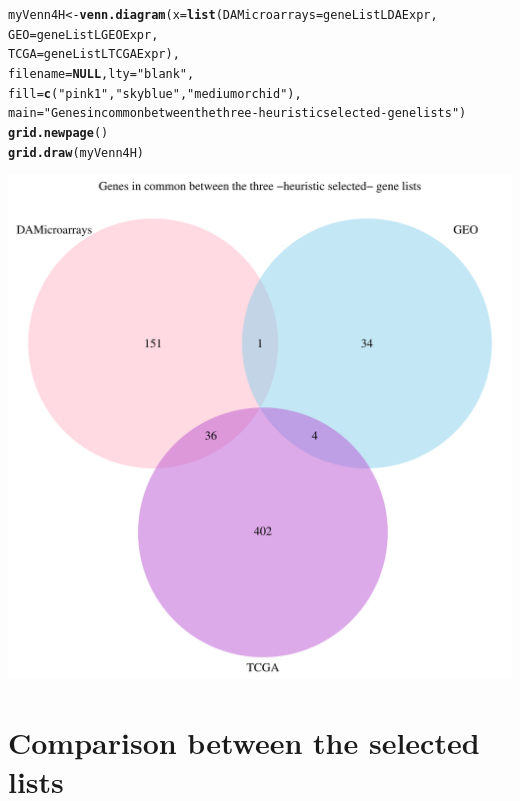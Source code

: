 \documentclass[a4paper,10pt]{article}\usepackage[]{graphicx}\usepackage[]{color}
\makeatletter
\def\maxwidth{ %
  \ifdim\Gin@nat@width>\linewidth
    \linewidth
  \else
    \Gin@nat@width
  \fi
}
\newcommand{\hlstr}[1]{\textcolor[rgb]{0.192,0.494,0.8}{#1}}%
\newcommand{\hlstd}[1]{\textcolor[rgb]{0.345,0.345,0.345}{#1}}%
\newcommand{\hlkwa}[1]{\textcolor[rgb]{0.161,0.373,0.58}{\textbf{#1}}}%
\newcommand{\hlkwb}[1]{\textcolor[rgb]{0.69,0.353,0.396}{#1}}%
\newcommand{\hlkwc}[1]{\textcolor[rgb]{0.333,0.667,0.333}{#1}}%
\newcommand{\hlkwd}[1]{\textcolor[rgb]{0.737,0.353,0.396}{\textbf{#1}}}%
\newenvironment{kframe}{%
 \def\at@end@of@kframe{}%
 \ifinner\ifhmode%
  \def\at@end@of@kframe{\end{minipage}}%
  \begin{minipage}{\columnwidth}%
 \fi\fi%
 \def\FrameCommand##1{\hskip\@totalleftmargin \hskip-\fboxsep
 \colorbox{shadecolor}{##1}\hskip-\fboxsep
     \hskip-\linewidth \hskip-\@totalleftmargin \hskip\columnwidth}%
 \MakeFramed {\advance\hsize-\width
   \@totalleftmargin\z@ \linewidth\hsize
   \@setminipage}}%
 {\par\unskip\endMakeFramed%
 \at@end@of@kframe}
\newenvironment{knitrout}{}{} %
\makeatother
\begin{document}
\begin{knitrout}
\color{fgcolor}\begin{kframe}
\begin{alltt}
\hlstd{myVenn4H}\hlkwb{<-} \hlkwd{venn.diagram}\hlstd{(}\hlkwc{x}\hlstd{=}\hlkwd{list}\hlstd{(}\hlkwc{DAMicroarrays}\hlstd{=geneListLDAExpr,}
                              \hlkwc{GEO}\hlstd{=geneListLGEOExpr,}
                              \hlkwc{TCGA}\hlstd{=geneListLTCGAExpr),}
                              \hlkwc{filename}\hlstd{=}\hlkwa{NULL}\hlstd{,} \hlkwc{lty} \hlstd{=} \hlstr{"blank"}\hlstd{,}
                              \hlkwc{fill}\hlstd{=}\hlkwd{c}\hlstd{(}\hlstr{"pink1"}\hlstd{,} \hlstr{"skyblue"}\hlstd{,} \hlstr{"mediumorchid"}\hlstd{),}
                           \hlkwc{main}\hlstd{=}\hlstr{"Genes in common between the three -heuristic selected- gene lists"}\hlstd{)}
\hlkwd{grid.newpage}\hlstd{()}
\hlkwd{grid.draw}\hlstd{(myVenn4H)}
\end{alltt}
\end{kframe}
\includegraphics[width=\maxwidth]{figure/commonHeuristic3-1} 

\end{knitrout}


\section{Comparison between the selected lists}
\end{document}
